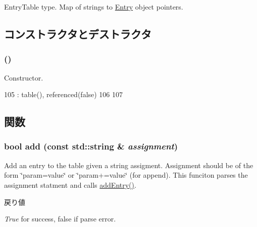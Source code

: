 EntryTable type. Map of strings to \hyperlink{classIniFile_1_1Entry}{Entry} object pointers. 

\subsection{コンストラクタとデストラクタ}
\hypertarget{classIniFile_1_1Section_a431219dba705401fd07b93d3232656c6}{
\subsubsection[{Section}]{ ()}}
\label{classIniFile_1_1Section_a431219dba705401fd07b93d3232656c6}


Constructor. 


\begin{DoxyCode}
105             : table(), referenced(false)
106         {
107         }
\end{DoxyCode}


\subsection{関数}
\hypertarget{classIniFile_1_1Section_a17a35c61f796d02d1071b18fcc5a8d5f}{
\subsubsection[{add}]{\setlength{\rightskip}{0pt plus 5cm}bool add (const std::string \& {\em assignment})}}
\label{classIniFile_1_1Section_a17a35c61f796d02d1071b18fcc5a8d5f}
Add an entry to the table given a string assigment. Assignment should be of the form \char`\"{}param=value\char`\"{} or \char`\"{}param+=value\char`\"{} (for append). This funciton parses the assignment statment and calls \hyperlink{classIniFile_1_1Section_a413d316c230aa09f6a7ec81c0f6a0a3c}{addEntry()}. 
\begin{DoxyRetVals}{戻り値}
\item[{\em True}]for success, false if parse error. \end{DoxyRetVals}



